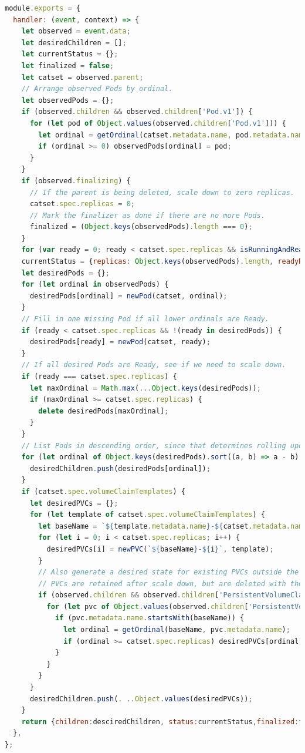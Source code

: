\documentclass[macfonts,master]{njuthesis}
\begin{document}
\begin{lstlisting}[language=JavaScript,caption=生成Pod和PVC,label=listing:catset]
module.exports = {
  handler: (event, context) => {
    let observed = event.data;
    let desiredChildren = [];
    let currentStatus = {};
    let finalized = false;
    let catset = observed.parent;
    // Arrange observed Pods by ordinal.
    let observedPods = {};
    if (observed.children && observed.children['Pod.v1']) {
      for (let pod of Object.values(observed.children['Pod.v1'])) {
        let ordinal = getOrdinal(catset.metadata.name, pod.metadata.name);
        if (ordinal >= 0) observedPods[ordinal] = pod;
      }
    }
    if (observed.finalizing) {
      // If the parent is being deleted, scale down to zero replicas.
      catset.spec.replicas = 0;
      // Mark the finalizer as done if there are no more Pods.
      finalized = (Object.keys(observedPods).length === 0);
    }
    for (var ready = 0; ready < catset.spec.replicas && isRunningAndReady(observedPods[ready]); ready++) ;
    currentStatus = {replicas: Object.keys(observedPods).length, readyReplicas: ready};
    let desiredPods = {};
    for (let ordinal in observedPods) {
      desiredPods[ordinal] = newPod(catset, ordinal);
    }
    // Fill in one missing Pod if all lower ordinals are Ready.
    if (ready < catset.spec.replicas && !(ready in desiredPods)) {
      desiredPods[ready] = newPod(catset, ready);
    }
    // If all desired Pods are Ready, see if we need to scale down.
    if (ready === catset.spec.replicas) {
      let maxOrdinal = Math.max(...Object.keys(desiredPods));
      if (maxOrdinal >= catset.spec.replicas) {
        delete desiredPods[maxOrdinal];
      }
    }
    // List Pods in descending order, since that determines rolling update order.
    for (let ordinal of Object.keys(desiredPods).sort((a, b) => a - b).reverse()) {
      desiredChildren.push(desiredPods[ordinal]);
    }
    if (catset.spec.volumeClaimTemplates) {
      let desiredPVCs = {};
      for (let template of catset.spec.volumeClaimTemplates) {
        let baseName = `${template.metadata.name}-${catset.metadata.name}`;
        for (let i = 0; i < catset.spec.replicas; i++) {
          desiredPVCs[i] = newPVC(`${baseName}-${i}`, template);
        }
        // Also generate a desired state for existing PVCs outside the range.
        // PVCs are retained after scale down, but are deleted with the CatSet.
        if (observed.children && observed.children['PersistentVolumeClaim.v1']) {
          for (let pvc of Object.values(observed.children['PersistentVolumeClaim.v1'])) {
            if (pvc.metadata.name.startsWith(baseName)) {
              let ordinal = getOrdinal(baseName, pvc.metadata.name);
              if (ordinal >= catset.spec.replicas) desiredPVCs[ordinal] = newPVC(pvc.metadata.name, template);
            }
          }
        }
      }
      desiredChildren.push(. ..Object.values(desiredPVCs));
    }
    return {children:desciredChildren, status:currentStatus,finalized:finalized};
  },
};
\end{lstlisting}
\end{document}
